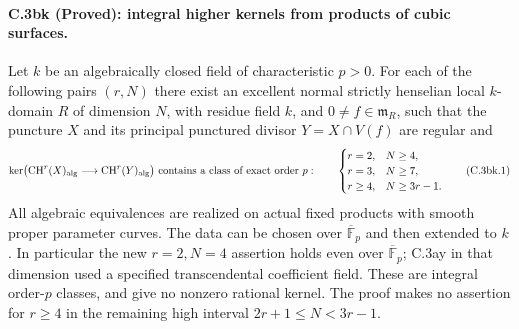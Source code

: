 \paragraph{C.3bk (Proved): integral higher kernels from products of cubic surfaces.}
Let $k$ be an algebraically closed field of characteristic $p>0$.
For each of the following pairs $(r,N)$ there exist an excellent normal
strictly henselian local $k$-domain $R$ of dimension $N$, with residue
field $k$, and $0\ne f\in\mathfrak m_R$, such that the puncture $X$
and its principal punctured divisor $Y=X\cap V(f)$ are regular and
\[
 \ker\bigl(\mathrm{CH}^r(X)_{\rm alg}
             \longrightarrow\mathrm{CH}^r(Y)_{\rm alg}\bigr)
 \text{ contains a class of exact order }p:
 \qquad
 \begin{cases}
 r=2,&N\ge4,\\
 r=3,&N\ge7,\\
 r\ge4,&N\ge3r-1.
 \end{cases}
 \tag{C.3bk.1}
\]
All algebraic equivalences are realized on actual fixed products with
smooth proper parameter curves. The data can be chosen over
$\overline{\mathbb F}_p$ and then extended to $k$. In particular the
new $r=2,N=4$ assertion holds even over $\overline{\mathbb F}_p$;
C.3ay in that dimension used a specified transcendental coefficient
field. These are integral order-$p$ classes, and give no nonzero
rational kernel. The proof makes no assertion for $r\ge4$ in the
remaining high interval $2r+1\le N<3r-1$.

